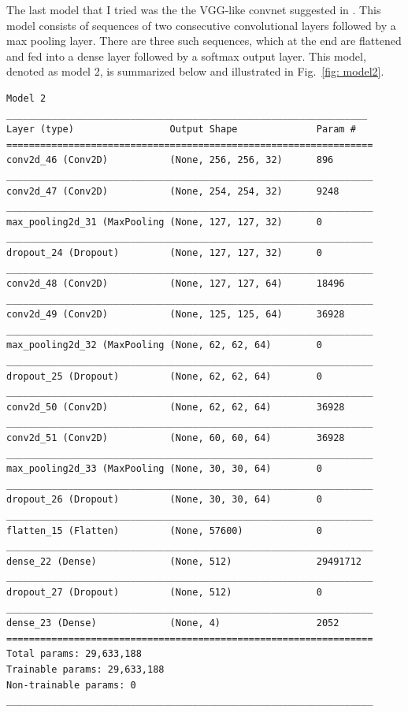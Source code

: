 \documentclass[10pt,a4paper]{article}
\begin{document}
\newpage
\noindent
The last model that I tried was the the VGG-like convnet suggested in \cite{KerasDocs}. This model consists of sequences of two consecutive convolutional layers followed by a max pooling layer. There are three such sequences, which at the end are flattened and fed into a dense layer followed by a softmax output layer. This model, denoted as model 2, is summarized below and illustrated in Fig.~\ref{fig: model2}.
\begin{lstlisting}
Model 2
________________________________________________________________
Layer (type)                 Output Shape              Param #   
=================================================================
conv2d_46 (Conv2D)           (None, 256, 256, 32)      896       
_________________________________________________________________
conv2d_47 (Conv2D)           (None, 254, 254, 32)      9248      
_________________________________________________________________
max_pooling2d_31 (MaxPooling (None, 127, 127, 32)      0         
_________________________________________________________________
dropout_24 (Dropout)         (None, 127, 127, 32)      0         
_________________________________________________________________
conv2d_48 (Conv2D)           (None, 127, 127, 64)      18496     
_________________________________________________________________
conv2d_49 (Conv2D)           (None, 125, 125, 64)      36928     
_________________________________________________________________
max_pooling2d_32 (MaxPooling (None, 62, 62, 64)        0         
_________________________________________________________________
dropout_25 (Dropout)         (None, 62, 62, 64)        0         
_________________________________________________________________
conv2d_50 (Conv2D)           (None, 62, 62, 64)        36928     
_________________________________________________________________
conv2d_51 (Conv2D)           (None, 60, 60, 64)        36928     
_________________________________________________________________
max_pooling2d_33 (MaxPooling (None, 30, 30, 64)        0         
_________________________________________________________________
dropout_26 (Dropout)         (None, 30, 30, 64)        0         
_________________________________________________________________
flatten_15 (Flatten)         (None, 57600)             0         
_________________________________________________________________
dense_22 (Dense)             (None, 512)               29491712  
_________________________________________________________________
dropout_27 (Dropout)         (None, 512)               0         
_________________________________________________________________
dense_23 (Dense)             (None, 4)                 2052      
=================================================================
Total params: 29,633,188
Trainable params: 29,633,188
Non-trainable params: 0
_________________________________________________________________
\end{lstlisting}
\end{document}
